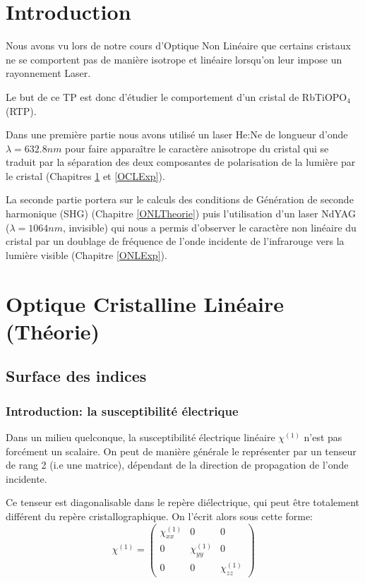 \documentclass[a4paper,11pt]{report}
\begin{document}
\setcounter{tocdepth}{1}

\chapter*{Introduction} 
Nous avons vu lors de notre cours d'Optique Non Linéaire que certains cristaux ne se comportent pas de manière isotrope et linéaire lorsqu'on leur impose un rayonnement Laser.

Le but de ce TP est donc d'étudier le comportement d'un cristal de RbTiOPO$_4$ (RTP).

Dans une première partie nous avons utilisé un laser He:Ne de longueur d'onde $\lambda = 632.8nm$ pour faire apparaître le caractère anisotrope du cristal qui se traduit par la séparation des deux composantes de polarisation de la lumière par le cristal (Chapitres \ref{OCLTheorie} et \ref{OCLExp}).

La seconde partie portera sur le calculs des conditions de Génération de seconde harmonique (SHG) (Chapitre \ref{ONLTheorie}) puis l'utilisation d'un laser NdYAG ($\lambda = 1064nm$, invisible) qui nous a permis d'observer le caractère non linéaire du cristal par un doublage de fréquence de l'onde incidente de l'infrarouge vers la lumière visible (Chapitre \ref{ONLExp}).

\chapter{Optique Cristalline Linéaire (Théorie)} \label{OCLTheorie}
\section{Surface des indices}
\subsection{Introduction: la susceptibilité électrique}
Dans un milieu quelconque, la susceptibilité électrique linéaire $\chi^{(1)}$ n'est pas forcément un scalaire. On peut de manière générale le représenter par un tenseur de rang 2 (i.e une matrice), dépendant de la direction de propagation de l'onde incidente.

Ce tenseur est diagonalisable dans le repère diélectrique, qui peut être totalement différent du repère cristallographique. On l'écrit alors sous cette forme:
\[\chi^{(1)} = 
\left( \begin{matrix}
\chi^{(1)}_{xx}   & 0                 & 0 \\
0                 & \chi^{(1)}_{yy}   & 0 \\
0                 & 0                 & \chi^{(1)}_{zz}
\end{matrix}\right) \]
\end{document}
